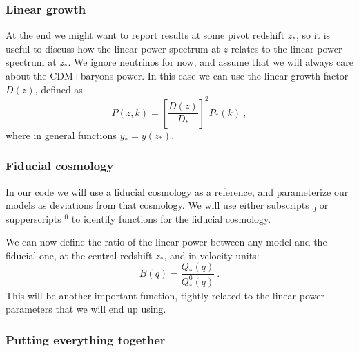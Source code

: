 \subsubsection{Linear growth}

At the end we might want to report results at some pivot redshift $z_\ast$,
so it is useful to discuss how the linear power spectrum at $z$ relates to the
linear power spectrum at $z_\ast$.
We ignore neutrinos for now, and assume that we will always care about the 
CDM+baryons power.
In this case we can use the linear growth factor $D(z)$, defined as
\begin{equation}
 P(z,k) = \left[\frac{D(z)}{D_\ast}\right]^2 P_\ast(k) ~,
\end{equation}
where in general functions $y_\ast = y(z_\ast)$.


\subsubsection{Fiducial cosmology}

In our code we will use a fiducial cosmology as a reference, and parameterize
our models as deviations from that cosmology.
We will use either subscripts $_0$ or supperscripts $^0$ to identify functions
for the fiducial cosmology.

We can now define the ratio of the linear power between any model and the
fiducial one, at the central redshift $z_\ast$, and in velocity units:
\begin{equation}
 B(q) = \frac{Q_\ast(q)}{Q^0_\ast(q)} ~.
\end{equation}
This will be another important function, tightly related to the linear
power parameters that we will end up using.


\subsubsection{Putting everything together}


